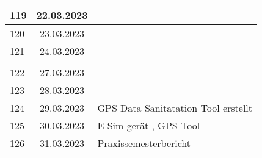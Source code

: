 \begin{longtable}{|l|c|l|}
119 & 22.03.2023    &                                                       \\ \hline
120 & 23.03.2023    &                                                       \\ \hline
121 & 24.03.2023    &                                                       \\ \hline
&               &                                                       \\ \hline 
122 & 27.03.2023    &                                                       \\ \hline
123 & 28.03.2023    &                                                       \\ \hline
124 & 29.03.2023    &  GPS Data Sanitatation Tool erstellt                                                  \\ \hline
125 & 30.03.2023    &  E-Sim gerät \q{ausgetauscht}, GPS Tool                                                    \\ \hline
126 & 31.03.2023    &  Praxissemesterbericht                                                    \\ \hline












\end{longtable}